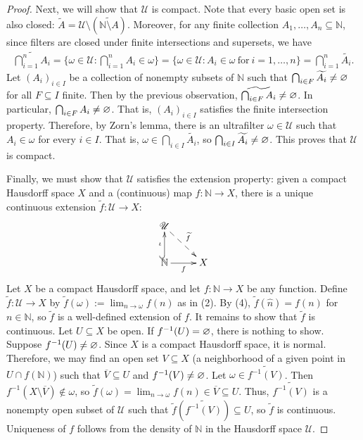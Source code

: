 \documentclass[a4paper,10pt]{report}
\newcommand{\N}{\mathbb{N}}
\begin{document}
\begin{enumerate}
\begin{enumerate}
\begin{proof}
					Next, we will show that $\mathscr{U}$ is compact.
					Note that every basic open set is also closed:
					$\widetilde{A} = \mathscr{U} \setminus \left( \widetilde{\N \setminus A} \right)$.
					Moreover, for any finite collection $A_1, \dots, A_n \subseteq \N$,
					since filters are closed under finite intersections and supersets, we have
					\begin{align*}
						\widetilde{\bigcap_{i=1}^n{A_i}}
						 = \{\omega \in \mathscr{U} : \bigcap_{i=1}^n{A_i} \in \omega\}
						 = \{\omega \in \mathscr{U} : A_i \in \omega~\text{for}~i = 1, \dots, n\}
						 = \bigcap_{i=1}^n{\widetilde{A_i}}.
					\end{align*}
					Let $(A_i)_{i \in I}$ be a collection of nonempty subsets of $\N$
					such that $\bigcap_{i \in F}{\widetilde{A_i}} \ne \varnothing$ for all $F \subseteq I$ finite.
					Then by the previous observation, $\widetilde{\bigcap_{i \in F}{A_i}} \ne \varnothing$.
					In particular, $\bigcap_{i \in F}{A_i} \ne \varnothing$.
					That is, $(A_i)_{i \in I}$ satisfies the finite intersection property.
					Therefore, by Zorn's lemma, there is an ultrafilter $\omega \in \mathscr{U}$
					such that $A_i \in \omega$ for every $i \in I$.
					That is, $\omega \in \bigcap_{i \in I}{\widetilde{A_i}}$,
					so $\bigcap_{i \in I}{\widetilde{A_i}} \ne \varnothing$.
					This proves that $\mathscr{U}$ is compact.
					
					Finally, we must show that $\mathscr{U}$ satisfies the extension property:
					given a compact Hausdorff space $X$ and a (continuous) map $f : \N \to X$,
					there is a unique continuous extension $\widetilde{f} : \mathscr{U} \to X$:
					\begin{displaymath}
						\xymatrix{
							\mathscr{U} \ar@{-->} [rd]^-{\widetilde{f}} \\
							\N \ar[r]_-f \ar@{^{(}->}[u]^-\iota & X
						}
					\end{displaymath}
					Let $X$ be a compact Hausdorff space, and let $f : \N \to X$ be any function.
					Define $\widetilde{f} : \mathscr{U} \to X$ by
					$\widetilde{f}(\omega) := \lim_{n \to \omega}{f(n)}$ as in (2).
					By (4), $\widetilde{f}(\widehat{n}) = f(n)$ for $n \in \N$, so $\widetilde{f}$
					is a well-defined extension of $f$.
					It remains to show that $\widetilde{f}$ is continuous.
					Let $U \subseteq X$ be open.
					If $f^{-1}(U) = \varnothing$, there is nothing to show.
					Suppose $f^{-1}(U) \ne \varnothing$.
					Since $X$ is a compact Hausdorff space, it is normal.
					Therefore, we may find an open set $V \subseteq X$
					(a neighborhood of a given point in $U \cap f(\N)$)
					such that $\overline{V} \subseteq U$
					and $f^{-1}(V) \ne \varnothing$.
					Let $\omega \in \widetilde{f^{-1}(V)}$.
					Then $f^{-1}(X \setminus \overline{V}) \notin \omega$,
					so $\widetilde{f}(\omega) = \lim_{n \to \omega}{f(n)} \in \overline{V} \subseteq U$.
					Thus, $\widetilde{f^{-1}(V)}$ is a nonempty open subset of $\mathscr{U}$
					such that $\widetilde{f}(\widetilde{f^{-1}(V)}) \subseteq U$,
					so $\widetilde{f}$ is continuous.
					Uniqueness of $f$ follows from the density of $\N$
					in the Hausdorff space $\mathscr{U}$.
				\end{proof}
				

\end{enumerate}
\end{enumerate}
\end{document}
